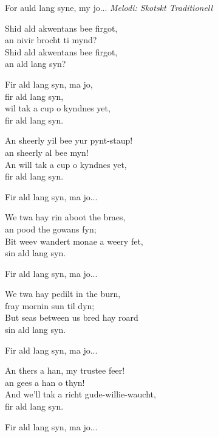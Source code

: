 For auld lang syne, my jo...
\vspace{15pt}
{\footnotesize\textit{Melodi: Skotskt Traditionell}}\par
\vspace{10pt}
Shid ald akwentans bee firgot,\\
an nivir brocht ti mynd?\\
Shid ald akwentans bee firgot,\\
an ald lang syn?\par
\vspace{10pt}
Fir ald lang syn, ma jo,\\
fir ald lang syn,\\
wil tak a cup o kyndnes yet,\\
fir ald lang syn.\par
\vspace{10pt}
An sheerly yil bee yur pynt-staup!\\
an sheerly al bee myn!\\
An will tak a cup o kyndnes yet,\\
fir ald lang syn.\par
\vspace{10pt}
Fir ald lang syn, ma jo...\par
\vspace{10pt}
We twa hay rin aboot the braes,\\
an pood the gowans fyn;\\
Bit weev wandert monae a weery fet,\\
sin ald lang syn.\par
\vspace{10pt}
Fir ald lang syn, ma jo...\par
\vspace{10pt}
We twa hay pedilt in the burn,\\
fray mornin sun til dyn;\\
But seas between us bred hay roard\\
sin ald lang syn.\par
\vspace{10pt}
Fir ald lang syn, ma jo...\par
\vspace{10pt}
An thers a han, my trustee feer!\\
an gees a han o thyn!\\
And we'll tak a richt gude-willie-waucht,\\
fir ald lang syn.\par
\vspace{10pt}
Fir ald lang syn, ma jo...
